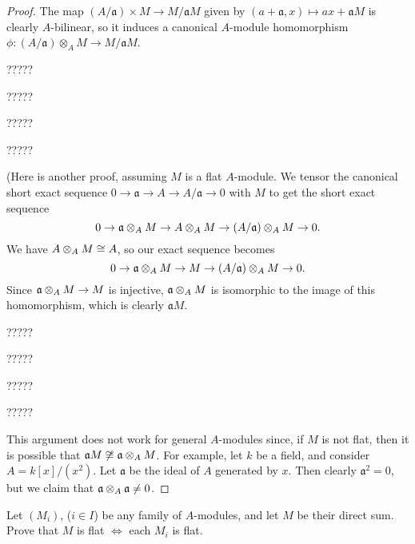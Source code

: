 \begin{proof}
The map $(A/\mathfrak a) \times M \to M / \mathfrak a M$ given by $(a + \mathfrak a, x) \mapsto a x + \mathfrak a M$ is clearly $A$-bilinear, so it induces a canonical $A$-module homomorphism $\phi : (A/\mathfrak a)\otimes_A M \to M/\mathfrak a M$.

?????

?????

?????

?????

(Here is another proof, assuming $M$ is a flat $A$-module.
We tensor the canonical short exact sequence $0 \to \mathfrak a \to A \to A/\mathfrak a \to 0$ with $M$ to get the short exact sequence
\begin{equation*}
0
\to \mathfrak a \otimes_A M
\to A \otimes_A M
\to (A/\mathfrak a) \otimes_A M
\to 0.
\end{equation*}
We have $A \otimes_A M \cong A$, so our exact sequence becomes
\begin{equation*}
0
\to \mathfrak a \otimes_A M
\to M
\to (A/\mathfrak a) \otimes_A M
\to 0.
\end{equation*}
Since $\mathfrak a \otimes_A M \to M$ is injective, $\mathfrak a \otimes_A M$ is isomorphic to the image of this homomorphism, which is clearly $\mathfrak a M$.

?????

?????

?????

?????

This argument does not work for general $A$-modules since, if $M$ is not flat, then it is possible that $\mathfrak a M \not\cong \mathfrak a \otimes_A M$.
For example, let $k$ be a field, and consider $A=k[x]/(x^2)$.
Let $\mathfrak a$ be the ideal of $A$ generated by $x$.
Then clearly $\mathfrak a^2 = 0$, but we claim that $\mathfrak a \otimes_A \mathfrak a \neq 0$.





\end{proof}



\begin{exercise}
\label{ex:2.3}

\end{exercise}

\begin{exercise}
\label{ex:2.4}
Let $(M_i)$, ($i \in I$) be any family of $A$-modules, and let $M$ be their direct sum.
Prove that $M$ is flat $\iff$ each $M_i$ is flat.
\end{exercise}

